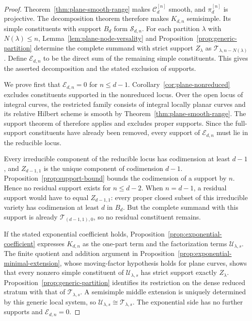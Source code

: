 \documentclass[11pt,reqno]{amsart}
\theoremstyle{definition}
\begin{document}
\begin{proof}
Theorem~\ref{thm:plane-smooth-range} makes
$\mathcal C_d^{[n]}$ smooth, and $\pi_d^{[n]}$ is projective.  The
decomposition theorem therefore makes $K_{d,n}$ semisimple.  Its simple
constituents with support $B_d$ form $\mathcal S_{d,n}$.  For each partition
$\lambda$ with $N(\lambda)\le n$, Lemma~\ref{lem:plane-node-versality} and
Proposition~\ref{prop:generic-partition} determine the complete summand with
strict support $Z_\lambda$ as
$\mathcal T_{\lambda,n-N(\lambda)}$.  Define $\mathcal E_{d,n}$ to be the
direct sum of the remaining simple constituents.  This gives the asserted
decomposition and the stated exclusion of supports.

We prove first that $\mathcal E_{d,n}=0$ for $n\le d-1$.
Corollary~\ref{cor:plane-nonreduced} excludes constituents supported in the
nonreduced locus.  Over the open locus of integral curves, the restricted
family consists of integral locally planar curves and its relative Hilbert
scheme is smooth by Theorem~\ref{thm:plane-smooth-range}.  The support theorem
of \cite[Theorem~1]{MiglioriniShende} therefore applies and excludes proper
supports.  Since the full-support
constituents have already been removed, every support of
$\mathcal E_{d,n}$ must lie in the reducible locus.

Every irreducible component of the reducible locus has codimension at least
$d-1$, and $Z_{d-1,1}$ is the unique component of codimension $d-1$.
Proposition~\ref{prop:support-bound} bounds the codimension of a support by
$n$.  Hence no residual support exists for $n\le d-2$.  When $n=d-1$, a
residual support would have to equal $Z_{d-1,1}$: every proper closed subset
of this irreducible variety has codimension at least $d$ in $B_d$.  But the
complete summand with this support is already
$\mathcal T_{(d-1,1),0}$, so no residual constituent remains.

If the stated exponential coefficient holds,
Proposition~\ref{prop:exponential-coefficient} expresses $K_{d,n}$ as the
one-part term and the factorization terms $\mathcal U_{\lambda,s}$.  The
finite quotient and addition argument in
Proposition~\ref{prop:exponential-minimal-extension}, whose moving-factor
hypothesis holds for plane curves, shows that every nonzero simple
constituent of $\mathcal U_{\lambda,s}$ has strict support exactly
$Z_\lambda$.  Proposition~\ref{prop:generic-partition} identifies its
restriction on the dense reduced stratum with that of
$\mathcal T_{\lambda,s}$.  A semisimple middle extension is uniquely
determined by this generic local system, so
$\mathcal U_{\lambda,s}\cong\mathcal T_{\lambda,s}$.  The exponential side
has no further supports and $\mathcal E_{d,n}=0$.
\end{proof}
\end{document}
